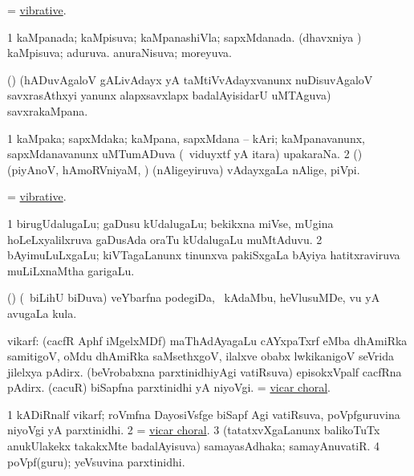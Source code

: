 \bentry
{} 
\gl{\gu}
\expl{}
\bmng
 = \hyperlink{vibrative}{vibrative}. 
\emng
\eentry

\bentry
{} 
\gl{\gu}
\expl{}
\bmng
\bnum
\num{1} kaMpanada; kaMpisuva; kaMpanashiVla; sapxMdanada. 
 (dhavxniya \vi) 
\banum
{} kaMpisuva; aduruva. 
 anuraNisuva; moreyuva. 
\eanum
\numie
\enum
\emng
\eentry

\bentry
{} 
\gl{\nA}
\bmng
 (\saM) (hADuvAgaloV gALivAdayx yA taMtiVvAdayxvanunx nuDisuvAgaloV savxrasAthxyi yanunx alapxsavxlapx badalAyisidarU uMTAguva) savxrakaMpana. 
\emng
\eentry

\bentry
{} 
\gl{\nA}
\expl{}
\bmng
\bnum
\num{1} kaMpaka; sapxMdaka; kaMpana, sapxMdana -- kAri; kaMpanavanunx, sapxMdanavanunx uMTumADuva (\kanmu\ viduyxtf yA itara) upakaraNa. 
\num{2} (\saM) (piyAnoV, hAmoRVniyaM, \mo) (nAligeyiruva) vAdayxgaLa nAlige, piVpi. 
\enum
\emng
\eentry

\bentry
{} 
\gl{\gu}
\expl{}
\bmng
 = \hyperlink{vibrative}{vibrative}. 
\emng
\eentry

\bentry
{} 
\gl{\nA}
\expl{(\bava)}
\bmng
\bnum
\num{1} birugUdalugaLu; gaDusu kUdalugaLu; bekikxna miVse, mUgina hoLeLxyalilxruva gaDusAda oraTu kUdalugaLu muMtAduvu. 
\num{2} bAyimuLuLxgaLu; kiVTagaLanunx tinunxva pakiSxgaLa bAyiya hatitxraviruva muLiLxnaMtha garigaLu. 
\enum
\emng
\eentry

\bentry
{} 
\gl{\nA}
\expl{}
\bmng
 (\savi) (\sA\ biLihU biDuva) veYbarfna podegiDa, \udA\ kAdaMbu, heVlusuMDe, \mo vu yA avugaLa kula. 
\emng
\eentry

\bentry
{}
\gl{\saMkiSx}
\expl{}
\bmng
\emng
\eentry

\bentry
{} 
\gl{\nA}
\expl{}
\bmng
 vikarf: 
\banum
{} (cacfR Aphf iMgelxMDf) maThAdAyagaLu cAYxpaTxrf eMba dhAmiRka samitigoV, oMdu dhAmiRka saMsethxgoV, ilalxve obabx lwkikanigoV seVrida jilelxya pAdirx. 
 (beVrobabxna parxtinidhiyAgi vatiRsuva) episokxVpalf cacfRna pAdirx. 
 (\roVkAyx cacuR) biSapfna parxtinidhi yA niyoVgi. 
 = \hyperlink{vicar choral}{vicar choral}. 
\eanum
\emng

\noindent
\gl{\pagu}
\expl{}
\bmng
\bnum
\num{1} kADiRnalf vikarf; roVmfna DayosiVsfge biSapf Agi vatiRsuva, poVpfguruvina niyoVgi yA parxtinidhi. 
\num{2}  = \hyperlink{vicar choral}{vicar choral}. 
\num{3}  (tatatxvXgaLanunx balikoTuTx anukUlakekx takakxMte badalAyisuva) samayasAdhaka; samayAnuvatiR. 
\num{4}  poVpf(guru); yeVsuvina parxtinidhi. 
\enum
\emng
\eentry

